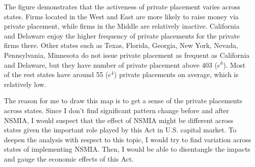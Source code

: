 \documentclass[letterpaper,12pt]{article}
\theoremstyle{definition}
\begin{document}
The figure demonstrates that the activeness of private placement varies across states. Firms located in the West and East are more likely to raise money via private placement, while firms in the Middle are relatively inactive. California and Delaware enjoy the higher frequency of private placements for the private firms there. Other states such as Texas, Florida, Georgia, New York, Nevada, Pennsylvania, Minnesota do not issue private placement as frequent as California and Delaware, but they have number of private placement above 403 ($ e^{6} $). Most of the rest states have around 55 ($ e^{4} $) private placements on average, which is relatively low.

The reason for me to draw this map is to get a sense of the private placements across states. Since I don't find significant pattern change before and after NSMIA, I would suspect that the effect of NSMIA might be different across states given the important role played by this Act in U.S. capital market. To deepen the analysis with respect to this topic, I would try to find variation across states of implementing NSMIA. Then, I would be able to disentangle the impacts and gauge the economic effects of this Act.

\clearpage


\end{document}
